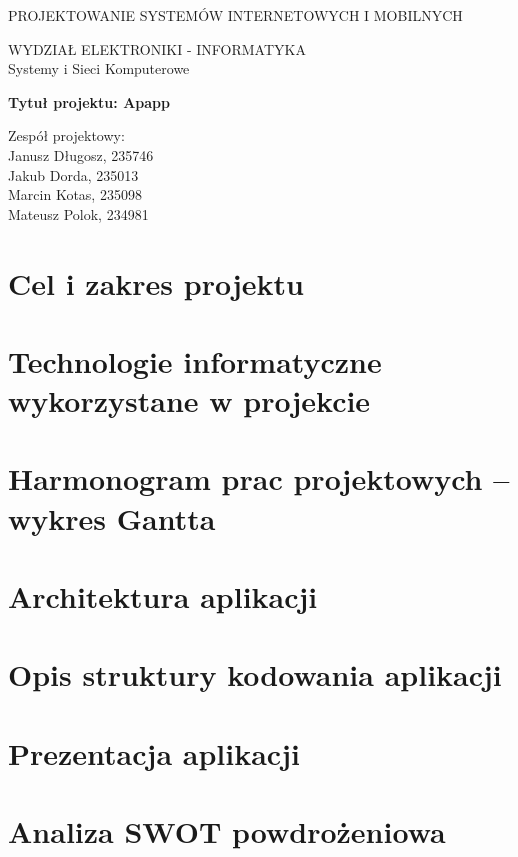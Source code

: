 \documentclass[polish, 11pt]{article}
\begin{document}
{
    \centering
    \Huge{PROJEKTOWANIE SYSTEMÓW INTERNETOWYCH I MOBILNYCH}
\vspace{2cm}

    \huge{WYDZIAŁ ELEKTRONIKI - INFORMATYKA \\ Systemy i Sieci Komputerowe}
\vspace{2cm}

    \LARGE{\textbf{Tytuł projektu: Apapp}}
\vspace{3cm}

    \begin{flushright}
        Zespół projektowy:\\
        Janusz Długosz, 235746\\
        Jakub Dorda, 235013\\
        Marcin Kotas, 235098\\
        Mateusz Polok, 234981
        
    \end{flushright}
}
\newpage
\tableofcontents
\newpage

\section{Cel i zakres projektu}

\section{Technologie informatyczne wykorzystane w projekcie}

\section{Harmonogram prac projektowych – wykres Gantta}

\section{Architektura aplikacji}

\section{Opis struktury kodowania aplikacji}

\section{Prezentacja aplikacji}

\section{Analiza SWOT powdrożeniowa}
\end{document}
